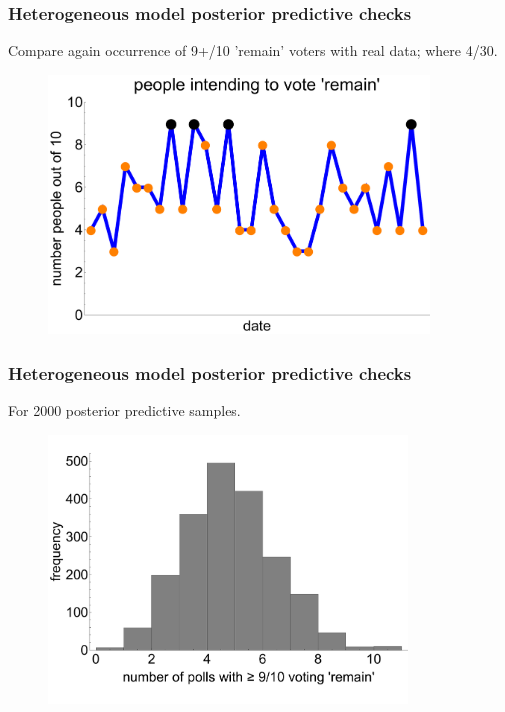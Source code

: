 \documentclass[handout]{beamer}
\begin{document}
\begin{frame}
	\frametitle{Heterogeneous model posterior predictive checks}
	 Compare again occurrence of 9+/10 'remain' voters with real data; where 4/30.
	
	\begin{figure}[ht]
		\centerline{\includegraphics[width=0.9\textwidth]{figures/lec6_euReferendumHighlighted.pdf}}
	\end{figure}
	
\end{frame}

\begin{frame}
	\frametitle{Heterogeneous model posterior predictive checks}
	For 2000 posterior predictive samples.
	
	\begin{figure}[ht]
		\centerline{\includegraphics[width=0.85\textwidth]{figures/lec6_euHeteroPPCHist1.pdf}}
	\end{figure}
	
\end{frame}
\end{document}
